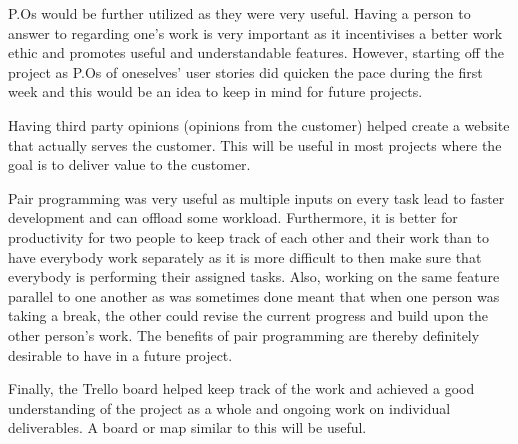 P.Os would be further utilized as they were very useful. Having a person to answer to regarding one's work is very important as it incentivises a better work ethic and promotes useful and understandable features. However, starting off the project as P.Os of oneselves’ user stories did quicken the pace during the first week and this would be an idea to keep in mind for future projects.

Having third party opinions (opinions from the customer) helped create a website that actually serves the customer. This will be useful in most projects where the goal is to deliver value to the customer.

Pair programming was very useful as multiple inputs on every task lead to faster development and can offload some workload. Furthermore, it is better for productivity for two people to keep track of each other and their work than to have everybody work separately as it is more difficult to then make sure that everybody is performing their assigned tasks. Also, working on the same feature parallel to one another as was sometimes done meant that when one person was taking a break, the other could revise the current progress and build upon the other person’s work. The benefits of pair programming are thereby definitely desirable to have in a future project.

Finally, the Trello board helped keep track of the work and achieved a good understanding of the project as a whole and ongoing work on individual deliverables. A board or map similar to this will be useful.



